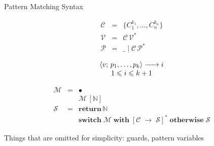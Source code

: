 \documentclass[aspectratio=169
  , xcolor={svgnames}
  , hyperref={ colorlinks,citecolor=Blue
             , linkcolor=DarkRed,urlcolor=DarkBlue}
  , russian
  ]{beamer}
\def\transarrow{\xrightarrow}
\def\padding{\phantom{X}}
\def\subarrow{}
\newcommand{\trans}[3]{{#1}\transarrow{\padding{\textstyle #2}\padding}\subarrow{#3}}
\newcommand{\inbr}[1]{\left<{#1}\right>}
\newcommand{\primi}[1]{\mathbf{#1}}
\newcommand{\ir}{\ensuremath{\mathcal{S}}}
\begin{document}
\begin{frame}[fragile]{Pattern Matching Syntax}
\begin{figure}[ht]
\begin{subfigure}[t]{0.4\linewidth}
$$
 \begin{array}{rcll}
    \mathcal{C} & = & \{ C_1^{k_1}, \dots, C_n^{k_n} \}\\
    \mathcal{V} & = & \mathcal{C}\,\mathcal{V}^*\\  
    \mathcal{P} & = & \_ \mid \mathcal{C}\,\mathcal{P}^*
 \end{array}
$$
$$
 \begin{array}{c}
\trans{\inbr{v;\,p_1,\dots,p_k}}{}{i}\\
1\leqslant i\leqslant k+1
 \end{array}
$$
\end{subfigure}
\hspace{0.5cm}
\begin{subfigure}[t]{0.5\linewidth}
\[
\begin{array}{rcl}
  \mathcal M & = & \bullet \\
  &   & \mathcal M\,[\mathbb{N}] \\
  \ir & = & \primi{return}\,\mathbb{N} \\
  &   & \primi{switch}\;\mathcal{M}\;\primi{with}\; [\mathcal{C}\; \primi{\rightarrow}\; \ir]^*\;\primi{otherwise}\;\ir
\end{array}
\]
\end{subfigure}
\end{figure}
\vspace{0.5cm}
Things that are omitted for simplicity: guards, pattern variables

\end{frame}
\end{document}
